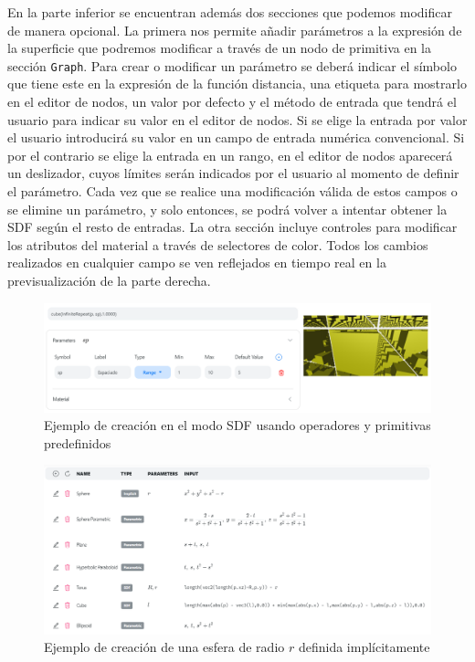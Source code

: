 En la parte inferior se encuentran además dos secciones que podemos modificar de manera opcional. La primera nos permite añadir parámetros a la expresión de la superficie que podremos modificar a través de un nodo de primitiva en la sección \texttt{Graph}. Para crear o modificar un parámetro se deberá indicar el símbolo que tiene este en la expresión de la función distancia, una etiqueta para mostrarlo en el editor de nodos, un valor por defecto y el método de entrada que tendrá el usuario para indicar su valor en el editor de nodos. Si se elige la entrada por valor el usuario introducirá su valor en un campo de entrada numérica convencional. Si por el contrario se elige la entrada en un rango, en el editor de nodos aparecerá un deslizador, cuyos límites serán indicados por el usuario al momento de definir el parámetro. Cada vez que se realice una modificación válida de estos campos o se elimine un parámetro, y solo entonces, se podrá volver a intentar obtener la SDF según el resto de entradas. La otra sección incluye controles para modificar los atributos del material a través de selectores de color. Todos los cambios realizados en cualquier campo se ven reflejados en tiempo real en la previsualización de la parte derecha.
\begin{figure}[ht!]
    \centering
    \includegraphics[width=\textwidth]{Plantilla-TFG-master/img/repeat.png}
    \caption{Ejemplo de creación en el modo SDF usando operadores y primitivas predefinidos}
    \label{fig:designSDF}
\end{figure}
\begin{figure}[ht!]
    \centering
    \includegraphics[width=\textwidth]{Plantilla-TFG-master/img/tablaParam.png}
    \caption{Ejemplo de creación de una esfera de radio $r$ definida implícitamente}
    \label{fig:desingImp}
\end{figure}

